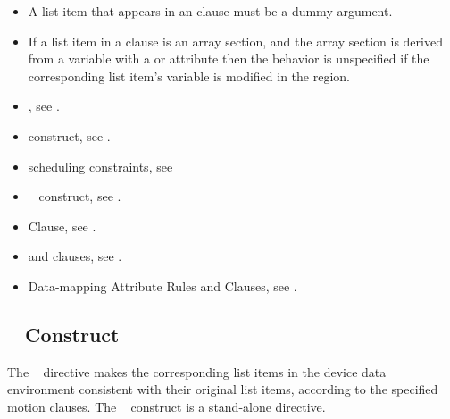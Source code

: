 {{{\begin{itemize}
\fortranspecificstart
\item A list item that appears in an  clause must be a dummy
  argument.
\item If a list item in a  clause is an array section, and the array section is derived from a variable with a  or  attribute then the behavior is unspecified if the corresponding list item's variable is modified in the region.
\fortranspecificend
\end{itemize}

\crossreferences
\begin{itemize}
\item {}, see 
. 

\item {} construct, see 
.

\item {} scheduling constraints, see 

\item {}~ construct, see 
.

\item {} Clause, see .

\item {} and  clauses, see 
.

\item Data-mapping Attribute Rules and Clauses, see 
.
\end{itemize}







\vspace{-24pt}

\subsection{~ Construct}
\label{subsec:target update Construct}
\summary
The ~ directive makes the corresponding list items in the device data 
environment consistent with their original list items, according to the specified motion 
clauses. The ~ construct is a stand-alone directive.

}}}

